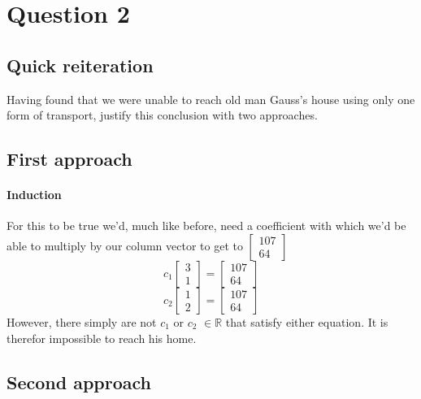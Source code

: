 \documentclass{article}
\begin{document}
\section{Question 2}
    \subsection{Quick reiteration}
    Having found that we were unable to reach old man Gauss's house using only
    one form of transport, justify this conclusion with two approaches.
    \subsection{First approach}
    \paragraph{Induction}
        For this to be true we'd, much like before, need a coefficient with which
        we'd be able to multiply by our column vector to get to $\begin{bmatrix}107 \\ 64\end{bmatrix}$
        \[{c_1}\begin{bmatrix}3 \\ 1\end{bmatrix} = \begin{bmatrix}107 \\ 64\end{bmatrix}\]
        \[{c_2}\begin{bmatrix}1 \\ 2\end{bmatrix} = \begin{bmatrix}107 \\ 64\end{bmatrix}\]
        However, there simply are not $c_1$ or $c_2$ $\in{\mathbb{R}}$ that satisfy either equation.
        It is therefor impossible to reach his home.
    \subsection{Second approach}
\end{document}
